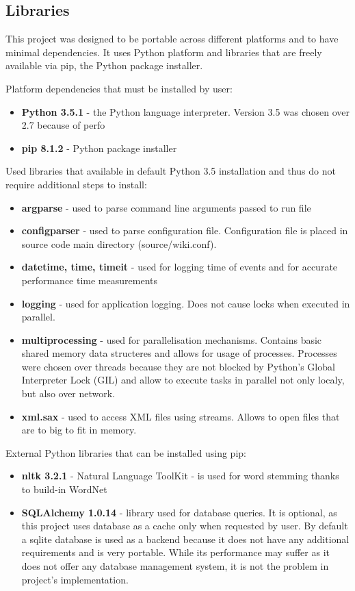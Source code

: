  
 
 
\subsection{Libraries} \label{design-libraries}
This project was designed to be portable across different platforms and to have minimal dependencies. It uses Python platform and libraries that are freely available via pip, the Python package installer.

Platform dependencies that must be installed by user:
\begin{itemize}
	\item \textbf{Python 3.5.1} - the Python language interpreter. Version 3.5 was chosen over 2.7 because of perfo
	\item\textbf{pip 8.1.2} - Python package installer
\end{itemize}

Used libraries that available in default Python 3.5 installation and thus do not require additional steps to install:
\begin{itemize}
	\item \textbf{argparse} - used to parse command line arguments passed to run file
	\item \textbf{configparser} - used to parse configuration file. Configuration file is placed in source code main directory (source/wiki.conf).
	\item \textbf{datetime, time, timeit} - used for logging time of events and for accurate performance time measurements
	\item \textbf{logging} - used for application logging. Does not cause locks when executed in parallel.
	\item \textbf{multiprocessing} - used for parallelisation mechanisms. Contains basic shared memory data structeres and allows for usage of processes. Processes were chosen over threads because they are not blocked by Python's Global Interpreter Lock (GIL) and allow to execute tasks in parallel not only localy, but also over network.
	\item \textbf{xml.sax} - used to access XML files using streams. Allows to open files that are to big to fit in memory.
\end{itemize}

External Python libraries that can be installed using pip:
\begin{itemize}
	\item \textbf{nltk 3.2.1} - Natural Language ToolKit - is used for word stemming thanks to build-in WordNet
	\item \textbf{SQLAlchemy 1.0.14} - library used for database queries. It is optional, as this project uses database as a cache only when requested by user. By default a sqlite database is used as a backend because it does not have any additional requirements and is very portable. While its performance may suffer as it does not offer any database management system, it is not the problem in project's implementation.
\end{itemize}


